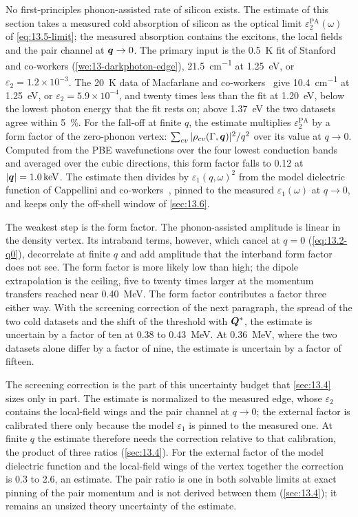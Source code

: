No first-principles phonon-assisted rate of silicon exists. The estimate of this section takes a measured cold absorption of silicon as the optical limit $\varepsilon_2^{\mathrm{PA}}(\omega)$ of \cref{eq:13.5-limit}; the measured absorption contains the excitons, the local fields and the pair channel at $\bm{q} \to 0$. The primary input is the \SI{0.5}{K} fit of Stanford and co-workers (\cref{we:13-darkphoton-edge}), \SI{21.5}{cm^{-1}} at \SI{1.25}{eV}, or $\varepsilon_2 = 1.2\times10^{-3}$. The \SI{20}{K} data of Macfarlane and co-workers~\cite{macfarlane1958fine} give \SI{10.4}{cm^{-1}} at \SI{1.25}{eV}, or $\varepsilon_2 = 5.9\times10^{-4}$, and twenty times less than the fit at \SI{1.20}{eV}, below the lowest photon energy that the fit rests on; above \SI{1.37}{eV} the two datasets agree within \SI{5}{\percent}. For the fall-off at finite $q$, the estimate multiplies $\varepsilon_2^{\mathrm{PA}}$ by a form factor of the zero-phonon vertex: $\sum_{cv}|\rho_{cv}(\mathrm{\Gamma},\bm{q})|^2/q^2$ over its value at $q \to 0$. Computed from the PBE wavefunctions over the four lowest conduction bands and averaged over the cubic directions, this form factor falls to 0.12 at $|\bm{q}| = \SI{1.0}{keV}$. The estimate then divides by $\varepsilon_1(q,\omega)^2$ from the model dielectric function of Cappellini and co-workers~\cite{cappellini1993model}, pinned to the measured $\varepsilon_1(\omega)$ at $q \to 0$, and keeps only the off-shell window of \cref{sec:13.6}.

The weakest step is the form factor. The phonon-assisted amplitude is linear in the density vertex. Its intraband terms, however, which cancel at $q = 0$ (\cref{eq:13.2-q0}), decorrelate at finite $q$ and add amplitude that the interband form factor does not see. The form factor is more likely low than high; the dipole extrapolation is the ceiling, five to twenty times larger at the momentum transfers reached near \SI{0.40}{MeV}. The form factor contributes a factor three either way. With the screening correction of the next paragraph, the spread of the two cold datasets and the shift of the threshold with $\bm{Q}^*$, the estimate is uncertain by a factor of ten at 0.38 to \SI{0.43}{MeV}. At \SI{0.36}{MeV}, where the two datasets alone differ by a factor of nine, the estimate is uncertain by a factor of fifteen.

The screening correction is the part of this uncertainty budget that \cref{sec:13.4} sizes only in part. The estimate is normalized to the measured edge, whose $\varepsilon_2$ contains the local-field wings and the pair channel at $q \to 0$; the external factor is calibrated there only because the model $\varepsilon_1$ is pinned to the measured one. At finite $q$ the estimate therefore needs the correction relative to that calibration, the product of three ratios (\cref{sec:13.4}). For the external factor of the model dielectric function and the local-field wings of the vertex together the correction is 0.3 to 2.6, an estimate. The pair ratio is one in both solvable limits at exact pinning of the pair momentum and is not derived between them (\cref{sec:13.4}); it remains an unsized theory uncertainty of the estimate.


